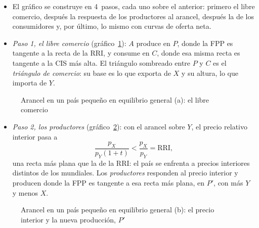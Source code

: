 \documentclass[11pt]{article}
\begin{document}
\begin{itemize}
\item El gráfico se construye en 4~pasos, cada uno sobre el anterior: primero el libre comercio, después la respuesta de los productores al arancel, después la de los consumidores y, por último, lo mismo con curvas de oferta neta.
\item \emph{Paso 1, el libre comercio} (gráfico~\ref{fig:pequeno-general-a}): $A$ produce en $P$, donde la FPP es tangente a la recta de la RRI, y consume en $C$, donde esa misma recta es tangente a la CIS más alta. El triángulo sombreado entre $P$ y $C$ es el \emph{triángulo de comercio}: su base es lo que exporta de $X$ y su altura, lo que importa de $Y$.
\end{itemize}
\begin{figure}[H]
\centering
\caption{Arancel en un país pequeño en equilibrio general (a): el libre comercio}\label{fig:pequeno-general-a}
\end{figure}
\begin{itemize}
\item \emph{Paso 2, los productores} (gráfico~\ref{fig:pequeno-general-b}): con el arancel sobre $Y$, el precio relativo interior pasa a
  \[
  \frac{p_X}{p_Y(1+t)}<\frac{p_X}{p_Y}=\mathrm{RRI},
  \]
  una recta más plana que la de la RRI: el país se enfrenta a precios interiores distintos de los mundiales. Los \emph{productores} responden al precio interior y producen donde la FPP es tangente a esa recta más plana, en $P'$, con más $Y$ y menos $X$.
\end{itemize}
\begin{figure}[H]
\centering
\caption{Arancel en un país pequeño en equilibrio general (b): el precio interior y la nueva producción, $P'$}\label{fig:pequeno-general-b}
\end{figure}
\end{document}
